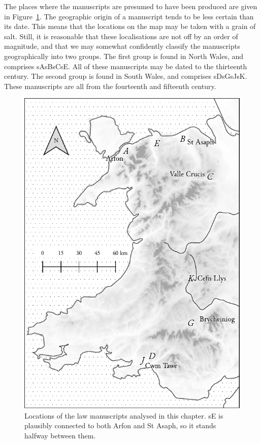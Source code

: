The places where the manuscripts are presumed to have been produced are given in Figure~\ref{fig:mslocs}. The geographic origin of a manuscript tends to be less certain than its date. This means that the locations on the map may be taken with a grain of salt. Still, it is reasonable that these localisations are not off by an order of magnitude, and that we may somewhat confidently classify the manuscripts geographically into two groups. The first group is found in North Wales, and comprises \gls{sA}\gls{sB}\gls{sC}\gls{sE}. All of these manuscripts may be dated to the thirteenth century. The second group is found in South Wales, and comprises \gls{sD}\gls{sG}\gls{sJ}\gls{sK}. These manuscripts are all from the fourteenth and fifteenth century.

\begin{figure}[h]
  \centering
  \includegraphics{3orth/images/mslocations.pdf}
  \caption[Locations of the law manuscripts.]{Locations of the law manuscripts analysed in this chapter. \gls{sE} is plausibly connected to both Arfon and St Asaph, so it stands halfway between them.}
  \label{fig:mslocs}
\end{figure}

